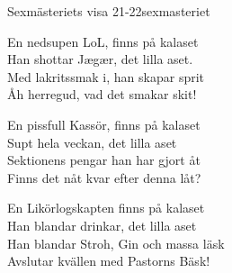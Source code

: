 \begin{song}{Sexmästeriets visa 21-22}{sexmasteriet}
\begin{vers}
En nedsupen LoL, finns på kalaset\\
Han shottar Jægær, det lilla aset.\\
Med lakritssmak i, han skapar sprit\\
Åh herregud, vad det smakar skit!
\end{vers}


\begin{vers}
En pissfull Kassör, finns på kalaset\\
Supt hela veckan, det lilla aset\\
Sektionens pengar han har gjort åt\\
Finns det nåt kvar efter denna låt?
\end{vers}

\begin{vers}
En Likörlogskapten finns på kalaset\\
Han blandar drinkar, det lilla aset\\
Han blandar Stroh, Gin och massa läsk\\
Avslutar kvällen med Pastorns Bäsk!
\end{vers}



\end{song}

